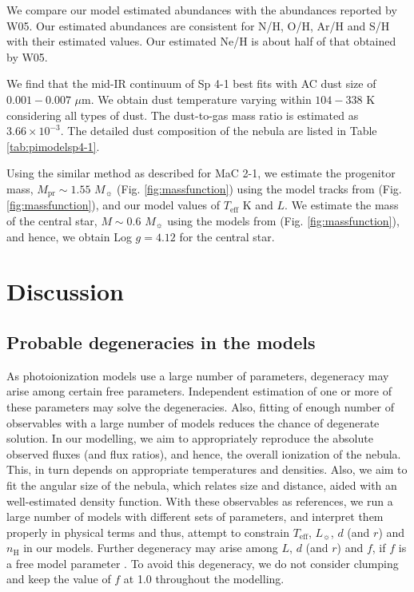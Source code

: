 \documentclass[a4paper,fleqn,usenatbib]{mnras}
\begin{document}
We compare our model estimated abundances with the abundances reported by W05. Our estimated abundances are consistent for N/H, O/H, Ar/H and S/H with their estimated values. Our estimated Ne/H is about half of that obtained by W05. 

We find that the mid-IR continuum of Sp 4-1 best fits with AC dust size of $0.001-0.007$ $\mu$m. We obtain dust temperature varying within $104-338$ K considering all types of dust. The dust-to-gas mass ratio is estimated as $3.66\times10^{-3}$. The detailed dust composition of the nebula are listed in Table \ref{tab:pimodelsp4-1}.  

Using the similar method as described for MaC 2-1, we estimate the progenitor mass, $M_\mathrm{pr}\sim1.55$ $M_{\sun}$ (Fig. \ref{fig:massfunction}) using the model tracks from \citet{1994ApJS...92..125V} (Fig. \ref{fig:massfunction}), and our model values of $T_\mathrm{eff}$ K and $L$. We estimate the mass of the central star, $M\sim0.6$ $M_{\sun}$ using the models from \citet{2013A&A...558A..78J} (Fig. \ref{fig:massfunction}), and hence, we obtain Log $g=4.12$ for the central star.

\section{Discussion} \label{sec:discussion}

\subsection{Probable degeneracies in the models}
As photoionization models use a large number of parameters, degeneracy may arise among certain free parameters. Independent estimation of one or more of these parameters may solve the degeneracies. Also, fitting of enough number of observables with a large number of models reduces the chance of degenerate solution. In our modelling, we aim to appropriately reproduce the absolute observed fluxes (and flux ratios), and hence, the overall ionization of the nebula. This, in turn depends on appropriate temperatures and densities. Also, we aim to fit the angular size of the nebula, which relates size and distance, aided with an well-estimated density function. With these observables as references, we run a large number of models with different sets of parameters, and interpret them properly in physical terms and thus, attempt to constrain $T_\mathrm{eff}$, $L_{\sun}$, $d$ (and $r$) and $n_\mathrm{H}$ in our models. Further degeneracy may arise among $L$, $d$ (and $r$) and $f$, if $f$ is a free model parameter \citep{2009A&A...507.1517M}. To avoid this degeneracy, we do not consider clumping and keep the value of $f$ at 1.0 throughout the modelling.
\end{document}
